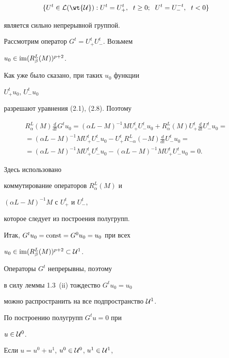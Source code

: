 \begin{pf}
\begin{equation}


\{ U^t \in {\cal L}(\wt {\cal U}):U^{t}=U^t_{+},\ \;


 t \ge 0;\ \; U^t=U^{-t}_{-},\ \; t<0\}


\end{equation}


является  сильно непрерывной группой.


Рассмотрим оператор $G^t=U^t_+U^t_-$. Возьмем


$u_0\in\operatorname{im} (R_{\beta}^L(M))^{p+2}$.


Как уже было сказано, при таких $u_0$ функции


$U^t_+u_0$, $U^t_-u_0$


разрешают уравнения (2.1), (2.8). Поэтому


\begin{multline*}


R_{\alpha }^L(M)\frac{d}{dt}G^tu_0=


(\alpha L-M)^{-1}MU^t_+U^t_-u_0+R_{\alpha}^L(M)U^t_+


\frac{d}{dt}U^t_-u_0=\\


=(\alpha L-M)^{-1}MU^t_+U^t_-u_0-


U^t_+R_{-\alpha}^L(-M)\frac{d}{dt}U^t_-u_0=\\


=(\alpha L-M)^{-1}MU^t_+U^t_-u_0-


(\alpha L-M)^{-1}MU^t_+U^t_-u_0=0.


\end{multline*}


Здесь использовано


коммутирование операторов $R_{\alpha}^L(M)$ и


$(\alpha L-M)^{-1}M$ с $U^t_+$ и $U^t_-$,


которое следует из построения полугрупп.


Итак, $G^tu_0=\operatorname{const}=G^0u_0=u_0$ при всех


$u_0\in\operatorname{im} (R_{\beta}^L(M))^{p+2}\subset {\cal U}^1$.


Операторы $G^t$ непрерывны, поэтому


в силу леммы 1.3~(ii) тождество $G^tu_0=u_0$


можно распространить на все подпространство ${\cal U}^1$.


По построению полугрупп $G^tu=0$ при


$u\in {\cal U}^0$.


Если $u=u^0+u^1$, $u^0\in {\cal U}^0$, $u^1\in {\cal U}^1$,



\end{pf}
